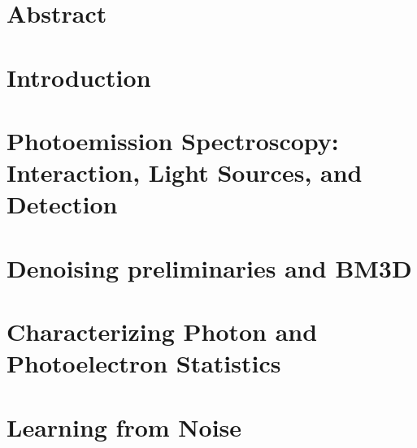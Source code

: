\documentclass[a4paper,11pt,twoside,openany]{book}
\begin{document}

\chapter*{Abstract}

\tableofcontents

\printglossary[style=tree, type=\acronymtype, title=List of Acronyms]
\glsaddall
\printglossary[type=symbols, style=tree, title=List of Symbols, nonumberlist]

\printglossary
\glsunsetall
\glsresetall

% 

\chapter{Introduction}


\chapter[Photoemission Spectroscopy: Interaction, Light Sources, and Detection]{Photoemission Spectroscopy:\\Interaction, Light Sources, and Detection}\label{ch:pes}


\chapter{Denoising preliminaries and BM3D}\label{ch:denoising}

% 

\chapter{Characterizing Photon and Photoelectron Statistics}\label{ch:pes-statistics}


\chapter{Learning from Noise}\label{ch:deep_learning}

\end{document}
